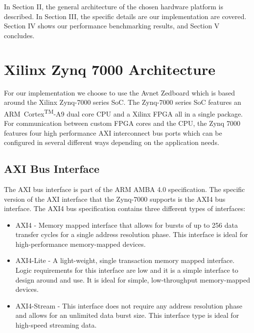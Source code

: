 \documentclass[journal]{IEEEtran}
\begin{document}
In Section II, the general architecture of the chosen hardware platform is described. In Section III, the specific details are our implementation are covered. Section IV shows our performance benchmarking results, and Section V concludes.


\section{Xilinx Zynq 7000 Architecture}
For our implementation we choose to use the Avnet Zedboard which is based around the Xilinx Zynq-7000 series SoC. The Zynq-7000 series SoC features an ARM\textregistered\ Cortex\textsuperscript{TM}-A9 dual core CPU and a Xilinx FPGA all in a single package. For communication between custom FPGA cores and the CPU, the Zynq 7000 features four high performance AXI interconnect bus ports which can be configured in several different ways depending on the application needs. \cite{Zynq-7000_Manual}




\subsection{AXI Bus Interface}
The AXI bus interface is part of the ARM AMBA 4.0 specification. The specific version of the AXI interface that the Zynq-7000 supports is the AXI4 bus interface. The AXI4 bus specification contains three different types of interfaces: \\

	\begin{itemize}
		
		\item AXI4 - Memory mapped interface that allows for bursts of up to 256 data transfer cycles for a single address resolution phase. This interface is ideal for high-performance memory-mapped devices.
		
		\item AXI4-Lite - A light-weight, single transaction memory mapped interface. Logic requirements for this interface are low and it is a simple interface to design around and use. It is ideal for simple, low-throughput memory-mapped devices.
		
		\item AXI4-Stream - This interface does not require any address resolution phase and allows for an unlimited data burst size. This interface type is ideal for high-speed streaming data. \\
		
	\end{itemize}
\end{document}
